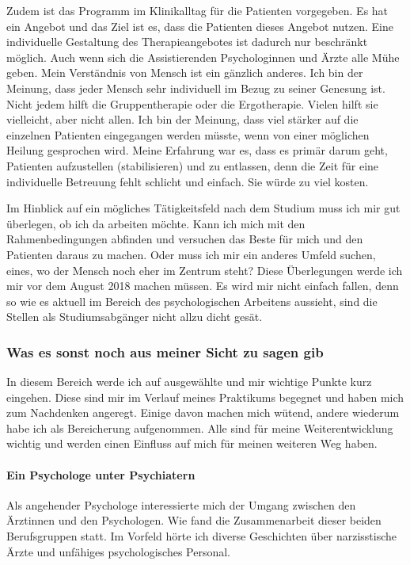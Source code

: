 Zudem ist das Programm im Klinikalltag für die Patienten vorgegeben. Es hat ein Angebot und das Ziel ist es, dass die Patienten dieses Angebot nutzen. Eine individuelle Gestaltung des Therapieangebotes ist dadurch nur beschränkt möglich. Auch wenn sich die Assistierenden Psychologinnen und Ärzte alle Mühe geben. Mein Verständnis von Mensch ist ein gänzlich anderes. Ich bin der Meinung, dass jeder Mensch sehr individuell im Bezug zu seiner Genesung ist. Nicht jedem hilft die Gruppentherapie oder die Ergotherapie. Vielen hilft sie vielleicht, aber nicht allen. Ich bin der Meinung, dass viel stärker auf die einzelnen Patienten eingegangen werden müsste, wenn von einer möglichen Heilung gesprochen wird. Meine Erfahrung war es, dass es primär darum geht, Patienten aufzustellen (stabilisieren) und zu entlassen, denn die Zeit für eine individuelle Betreuung fehlt schlicht und einfach. Sie würde zu viel kosten. 

Im Hinblick auf ein mögliches Tätigkeitsfeld nach dem Studium muss ich mir gut überlegen, ob ich da arbeiten möchte. Kann ich mich mit den Rahmenbedingungen abfinden und versuchen das Beste für mich und den Patienten daraus zu machen. Oder muss ich mir ein anderes Umfeld suchen, eines, wo der Mensch noch eher im Zentrum steht? Diese Überlegungen werde ich mir vor dem August 2018 machen müssen. Es wird mir nicht einfach fallen, denn so wie es aktuell im Bereich des psychologischen Arbeitens aussieht, sind die Stellen als Studiumsabgänger nicht allzu dicht gesät.
    
\subsubsection{Was es sonst noch aus meiner Sicht zu sagen gib} \label{sec:Sonstiges}
In diesem Bereich werde ich auf ausgewählte und mir wichtige Punkte kurz eingehen. Diese sind mir im Verlauf meines Praktikums begegnet und haben mich zum Nachdenken angeregt. Einige davon machen mich wütend, andere wiederum habe ich als Bereicherung aufgenommen. Alle sind für meine Weiterentwicklung wichtig und werden einen Einfluss auf mich für meinen weiteren Weg haben.

\paragraph{Ein Psychologe unter Psychiatern}
Als angehender Psychologe interessierte mich der Umgang zwischen den Ärztinnen und den Psychologen. Wie fand die Zusammenarbeit dieser beiden Berufsgruppen statt. Im Vorfeld hörte ich diverse Geschichten über narzisstische Ärzte und unfähiges psychologisches Personal. 

